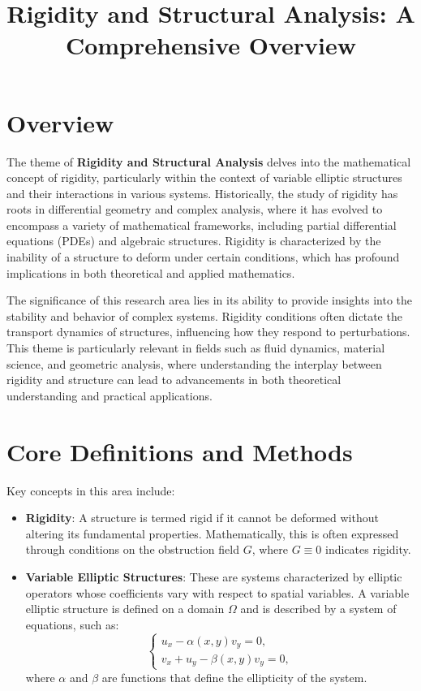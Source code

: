 \documentclass[11pt,a4paper]{article}
\title{Rigidity and Structural Analysis: A Comprehensive Overview}
\date{}
\begin{document}
\maketitle

\section{Overview}

The theme of \textbf{Rigidity and Structural Analysis} delves into the mathematical concept of rigidity, particularly within the context of variable elliptic structures and their interactions in various systems. Historically, the study of rigidity has roots in differential geometry and complex analysis, where it has evolved to encompass a variety of mathematical frameworks, including partial differential equations (PDEs) and algebraic structures. Rigidity is characterized by the inability of a structure to deform under certain conditions, which has profound implications in both theoretical and applied mathematics.

The significance of this research area lies in its ability to provide insights into the stability and behavior of complex systems. Rigidity conditions often dictate the transport dynamics of structures, influencing how they respond to perturbations. This theme is particularly relevant in fields such as fluid dynamics, material science, and geometric analysis, where understanding the interplay between rigidity and structure can lead to advancements in both theoretical understanding and practical applications.

\section{Core Definitions and Methods}

Key concepts in this area include:

\begin{itemize}
\item \textbf{Rigidity}: A structure is termed rigid if it cannot be deformed without altering its fundamental properties. Mathematically, this is often expressed through conditions on the obstruction field \( G \), where \( G \equiv 0 \) indicates rigidity.
\end{itemize}

\begin{itemize}
\item \textbf{Variable Elliptic Structures}: These are systems characterized by elliptic operators whose coefficients vary with respect to spatial variables. A variable elliptic structure is defined on a domain \( \Omega \) and is described by a system of equations, such as:
\[
\begin{cases}
u_x - \alpha(x, y) v_y = 0, \\
v_x + u_y - \beta(x, y) v_y = 0,
\end{cases}
\]
where \( \alpha \) and \( \beta \) are functions that define the ellipticity of the system.
\end{itemize}
\end{document}
